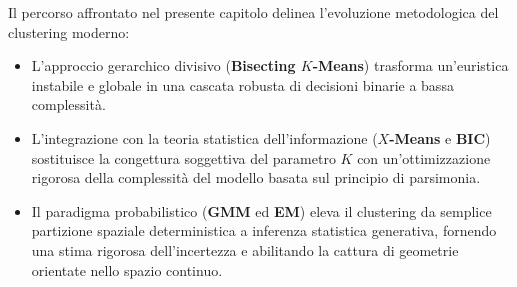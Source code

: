 Il percorso affrontato nel presente capitolo delinea l'evoluzione metodologica del clustering moderno:
\begin{itemize}
    \item L'approccio gerarchico divisivo (\textbf{Bisecting $K$-Means}) trasforma un'euristica instabile e globale in una cascata robusta di decisioni binarie a bassa complessità.
    \item L'integrazione con la teoria statistica dell'informazione (\textbf{$X$-Means} e \textbf{BIC}) sostituisce la congettura soggettiva del parametro $K$ con un'ottimizzazione rigorosa della complessità del modello basata sul principio di parsimonia.
    \item Il paradigma probabilistico (\textbf{GMM} ed \textbf{EM}) eleva il clustering da semplice partizione spaziale deterministica a inferenza statistica generativa, fornendo una stima rigorosa dell'incertezza e abilitando la cattura di geometrie orientate nello spazio continuo.
\end{itemize}
